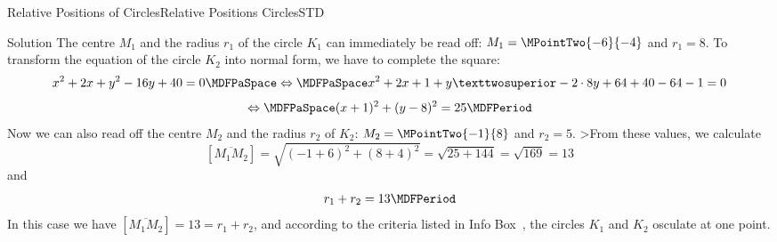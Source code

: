 \begin{MXContent}{Relative Positions of Circles}{Relative Positions Circles}{STD}
\begin{MExercise}
\begin{MHint}{Solution}
The centre $M_1$ and the radius $r_1$ of the circle $K_1$ can immediately be read off: $M_1=\MPointTwo{-6}{-4}$ and $r_1=8$. To transform the equation of the circle $K_2$ into normal form, 
we have to complete the square:
\[
 x^2+2x+y^2-16y+40=0\MDFPaSpace\Leftrightarrow\MDFPaSpace x^2+2x+1 + y²-2\cdot8y+64+40-64-1=0
\]
\[
 \Leftrightarrow\MDFPaSpace (x+1)^2+(y-8)^2=25\MDFPeriod
\]
Now we can also read off the centre $M_2$ and the radius $r_2$ of $K_2$: $M_2=\MPointTwo{-1}{8}$ and $r_2=5$. 
>From these values, we calculate
\[
 [\overline{M_1 M_2}]=\sqrt{(-1+6)^2+(8+4)^2}=\sqrt{25+144}=\sqrt{169}=13
\]
and
\[
 r_1+r_2=13 \MDFPeriod
\]
In this case we have $[\overline{M_1 M_2}]=13=r_1+r_2$, and according to the criteria listed in 
Info Box~, the circles $K_1$ and $K_2$ osculate at one point.
\end{MHint}

\end{MExercise}

\end{MXContent}

